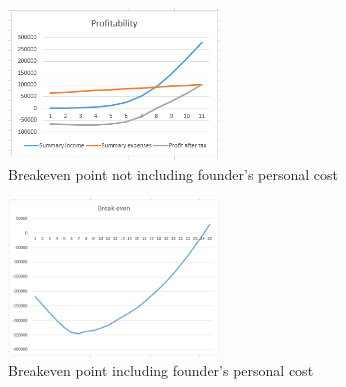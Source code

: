 \begin{figure}[H]
    \centering
    \includegraphics[width=0.5\textwidth]{figures/breakeven_no_salary.png}
    \caption{Breakeven point not including founder's personal cost}
    \label{fig:breakeven_no_salary}
\end{figure}

\begin{figure}[H]
    \centering
    \includegraphics[width=0.5\textwidth]{figures/breakeven_salary.png}
    \caption{Breakeven point including founder's personal cost}
    \label{fig:breakeven_salary}
\end{figure}